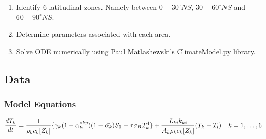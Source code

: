 \documentclass[12pt]{article}
\newcommand*\mean[1]{\overline{#1}}
\begin{document}
\begin{enumerate}
    \item Identify 6 latitudinal zones. Namely between $0-30^{\circ}NS$,
    $30-60^{\circ}NS$ and $60-90^{\circ}NS$.
    \item Determine parameters associated with each area.
    \item Solve ODE numerically using Paul Matlashewski's
    ClimateModel.py library.  
\end{enumerate}


\subsection{Data}
\subsubsection{Model Equations}
\label{sec:eqns}
\begin{equation} \label{eqn:dtk}
  \frac{dT_k}{dt} = \frac{1}{\mean{\rho_kc_k[Z_k]}}
  \{
    \gamma_k(1-\alpha_k^{sky})(1-\Bar{\alpha_k})S_0-\tau\sigma_BT_k^{4}
  \} +
  \frac{L_{ki}k_{ki}}{{A_k}\mean{\rho_kc_k[Z_k]}}(T_{k}-T_{i}) \quad k=1,\dots,6
\end{equation}
\end{document}
